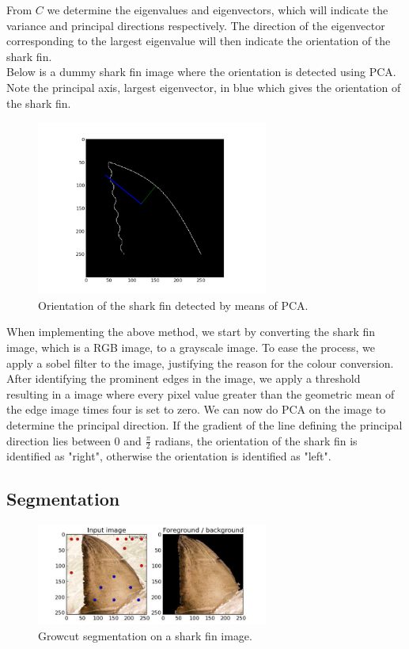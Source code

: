 \documentclass[a4paper,10pt]{article}
\begin{document}
From $C$ we determine the eigenvalues and eigenvectors, which will indicate the variance and principal directions respectively.
The direction of the eigenvector corresponding to the largest eigenvalue will then indicate the orientation of the shark fin. \\
 
Below is a dummy shark fin image where the orientation is detected using PCA.  Note the principal axis, largest eigenvector, in blue which gives the orientation of the shark fin.

\begin{figure}[H]
 \centering
 \includegraphics[width=3in]{orientation.jpg}
 \caption{Orientation of the shark fin detected by means of PCA.}
 \label{orientation}
\end{figure}

When implementing the above method, we start by converting the shark fin image, which is a RGB image, to a grayscale image.  To ease the process,
we apply a sobel filter to the image, justifying the reason for the colour conversion.  After identifying the prominent edges in the image, we apply a 
threshold resulting in a image where every pixel value greater than the geometric mean of the edge image times four is set to zero.  We can now do PCA on
the image to determine the principal direction.  If the gradient of the line defining the principal direction lies between 0 and $\frac{\pi}{2}$ 
radians, the orientation of the shark fin is identified as "right", otherwise the orientation is identified as "left". 

\subsection{Segmentation}

\begin{figure}[H]
 \centering
 \includegraphics[width=3in]{segmentation.jpg}
 \caption{Growcut segmentation on a shark fin image.}
 \label{segmentation}
\end{figure}
\end{document}
